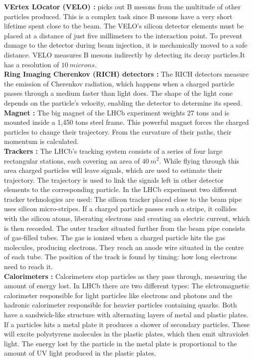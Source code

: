 \documentclass[english]{uzhpub}
\begin{document}
\textbf{VErtex LOcator (VELO) \cite{bib:velo} :} picks out B mesons from the multitude of other particles produced. This is a complex task since B mesons have a very short lifetime spent close to the beam. The VELO's silicon detector elements must be placed at a distance of just five millimeters to the interaction point. To prevent damage to the detector during beam injection, it is mechanically moved to a safe distance. VELO measures B mesons indirectly by detecting its decay particles.It has a resolution of $\SI{10}{microns}$.\\
\textbf{Ring Imaging Cherenkov (RICH) detectors \cite{bib:rich} :} The RICH detectors measure the emission of Cherenkov radiation, which happens when a charged particle passes through a medium faster than light does. The shape of the light cone depends on the particle's velocity, enabling the detector to determine its speed.  \\
\textbf{Magnet \cite{bib:mag} :} The big magnet of the LHCb experiment weights 27 tons and is mounted inside a 1,450 tons steel frame. This powerful magnet forces the charged particles to change their trajectory. From the curvature of their paths, their momentum is calculated.  \\
\textbf{Trackers \cite{bib:trac} :} The LHCb's tracking system consists of a series of four large rectangular stations, each covering an area of  $\SI{40}{m^2}$. While flying through this area charged particles will leave signals, which are used to estimate their trajectory. The trajectory is used to link the signals left in other detector elements to the corresponding particle. In the LHCb experiment two different tracker technologies are used:  The silicon tracker placed close to the beam pipe uses silicon micro-stripes. If a charged particle passes such a stripe, it collides with the silicon atoms, liberating electrons and creating an electric current, which is then recorded. The outer tracker situated further from the beam pipe consists of gas-filled tubes. The gas is ionized when a charged particle hits the gas molecules, producing electrons. They reach an anode wire situated in the centre of each tube. The position of the track is found by timing: how long electrons need to reach it. \\
\textbf{Calorimeters \cite{bib:calo} :} Calorimeters stop particles as they pass through, measuring the amount of energy lost. In LHCb there are two different types: The elctromagnetic calorimeter responsible for light particles like electrons and photons and the hadronic calorimeter responsible for heavier particles containing quarks. Both have a sandwich-like structure with alternating layers of metal and plastic plates. If a particles hits a metal plate it produces a shower of secondary particles. These will excite polystyrene molecules in the plastic plates, which then emit ultraviolet light. The energy lost by the particle in the metal plate is proportional to the amount of UV light produced in the plastic plates. \\
\end{document}
